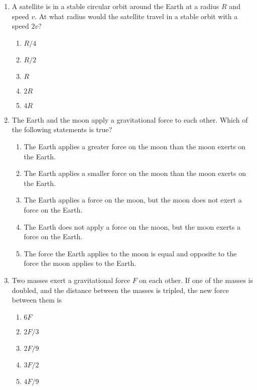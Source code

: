\documentclass{../../../oss-classkick}
\begin{document}
\begin{multicols}{2}
\begin{enumerate}[leftmargin=18pt,resume]
  \item A satellite is in a stable circular orbit around the Earth at a radius
    $R$ and speed $v$. At what radius would the satellite travel in a stable
    orbit with a speed $2v$?
    \begin{enumerate}[nosep,leftmargin=18pt,label=(\Alph*)]
    \item $R/4$
    \item $R/2$
    \item $R$
    \item $2R$
    \item $4R$
    \end{enumerate}

  \item The Earth and the moon apply a gravitational force to each other. Which
    of the following statements is true?
    \begin{enumerate}[nosep,leftmargin=18pt,label=(\Alph*)]
    \item The Earth applies a greater force on the moon than the moon exerts on
      the Earth.
    \item The Earth applies a smaller force on the moon than the moon exerts on
      the Earth.
    \item The Earth applies a force on the moon, but the moon does not exert a
      force on the Earth.
    \item The Earth does not apply a force on the moon, but the moon exerts a
      force on the Earth.
    \item The force the Earth applies to the moon is equal and opposite to the
      force the moon applies to the Earth.
    \end{enumerate}
    \vspace{.7in}
    \columnbreak
    
  \item Two masses exert a gravitational force $F$ on each other. If one of the
    masses is doubled, and the distance between the masses is tripled, the
    new force between them is
    \begin{enumerate}[nosep,leftmargin=18pt,label=(\Alph*)]
    \item $6F$
    \item $2F/3$
    \item $2F/9$
    \item $3F/2$
    \item $4F/9$
    \end{enumerate}
    

\end{enumerate}
\end{multicols}
\end{document}
